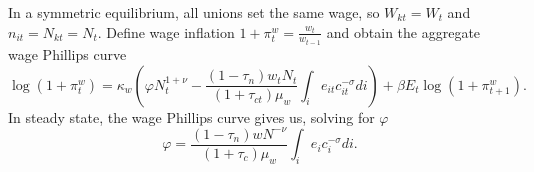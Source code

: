 \documentclass[11pt,a4paper]{article}
\begin{document}
In a symmetric equilibrium, all unions set the same wage, so $W_{kt}=W_t$ and $n_{it}=N_{kt}=N_t$. Define wage inflation $1+\pi_t^w=\frac{w_t}{w_{t-1}}$ and obtain the aggregate wage Phillips curve
\begin{equation*}
\log(1+\pi_t^w)=\kappa_w\left(\varphi N_{t}^{1+\nu}-\frac{(1-\tau_n)w_tN_t}{(1+\tau_{ct})\mu_w}\int_i e_{it}c_{it}^{-\sigma}di\right)+\beta E_t\log(1+\pi_{t+1}^w).
\end{equation*}
In steady state, the wage Phillips curve gives us, solving for $\varphi$
\begin{equation*}
\varphi=\frac{(1-\tau_n)wN^{-\nu}}{(1+\tau_c)\mu_w}\int_{i}e_{i}c_{i}^{-\sigma}di.
\end{equation*}
\end{document}
